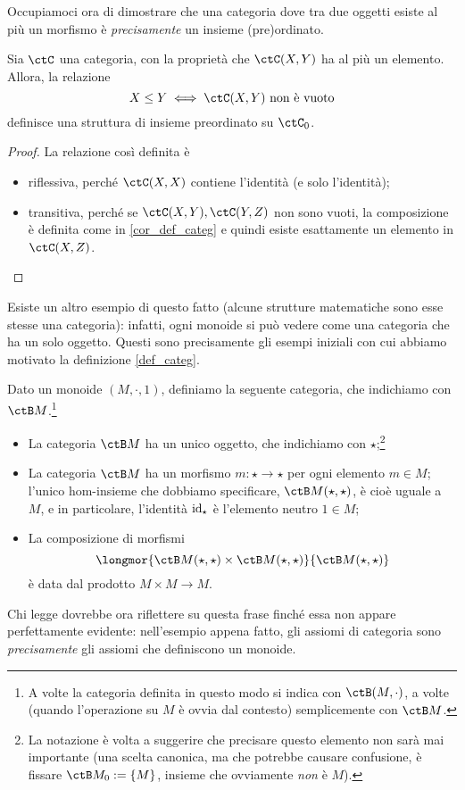 Occupiamoci ora di dimostrare che una categoria dove tra due oggetti esiste al più un morfismo è \emph{precisamente} un insieme (pre)ordinato.
\begin{theorem}\label{cat_sonopos}
	Sia \(\ctC\) una categoria, con la proprietà che \(\ctC(X,Y)\) ha al più un elemento. Allora, la relazione
	\[X\le Y \iff \ctC(X,Y) \text{ non è vuoto}\]
	definisce una struttura di insieme preordinato su \(\ctC_0\).
\end{theorem}
\begin{proof}
	La relazione così definita è
	\begin{itemize}
		\item riflessiva, perché \(\ctC(X,X)\) contiene l'identità (e solo l'identità);
		\item transitiva, perché se \(\ctC(X,Y), \ctC(Y,Z)\) non sono vuoti, la composizione è definita come in \ref{cor_def_categ} e quindi esiste esattamente un elemento in \(\ctC(X,Z)\).\qedhere
	\end{itemize}
\end{proof}
Esiste un altro esempio di questo fatto (alcune strutture matematiche sono esse stesse una categoria): infatti, ogni monoide si può vedere come una categoria che ha un solo oggetto. Questi sono precisamente gli esempi iniziali con cui abbiamo motivato la definizione \ref{def_categ}.
\begin{theorem}\label{mon_sonocat}
	Dato un monoide \((M,\cdot,1)\), definiamo la seguente categoria, che indichiamo con \(\ctB M\).\footnote{A volte la categoria definita in questo modo si indica con \(\ctB(M,\cdot)\), a volte (quando l'operazione su \(M\) è ovvia dal contesto) semplicemente con \(\ctB M\).}
	\begin{itemize}
		\item La categoria \(\ctB M\) ha un unico oggetto, che indichiamo con \(\star\);\footnote{La notazione è volta a suggerire che precisare questo elemento non sarà mai importante (una scelta canonica, ma che potrebbe causare confusione, è fissare \(\ctB M_0 := \{M\}\), insieme che ovviamente \emph{non} è \(M\)).}
		\item La categoria \(\ctB M\) ha un morfismo \(m:\star\to\star\) per ogni elemento \(m\in M\); l'unico hom-insieme che dobbiamo specificare, \(\Hom{\ctB M}(\star,\star)\), è cioè uguale a \(M\), e in particolare, l'identità \(\mathrm{id}_\star\) è l'elemento neutro \(1\in M\);
		\item La composizione di morfismi
		      \[\longmor{\Hom{\ctB M}(\star,\star)\times \Hom{\ctB M}(\star,\star)}{\Hom{\ctB M}(\star,\star)}\]
		      è data dal prodotto \(M\times M\to M\).
	\end{itemize}
\end{theorem}
Chi legge dovrebbe ora riflettere su questa frase finché essa non appare perfettamente evidente: nell'esempio appena fatto, gli assiomi di categoria sono \emph{precisamente} gli assiomi che definiscono un monoide.

